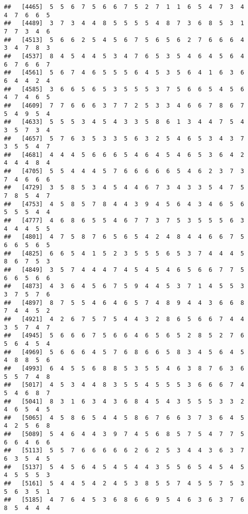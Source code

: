 \documentclass[
]{book}
\begin{document}
\begin{verbatim}
##   [4465]  5  5  6  7  5  6  6  7  5  2  7  1  1  6  5  4  7  3  4  4  7  6  6  5
##   [4489]  3  7  3  4  4  8  5  5  5  5  4  8  7  3  6  8  5  3  1  7  7  3  4  6
##   [4513]  5  6  6  2  5  4  5  6  7  5  6  5  6  2  7  6  6  6  4  3  4  7  8  3
##   [4537]  8  4  5  4  4  5  3  4  7  6  5  3  5  4  6  4  5  6  4  6  7  6  6  7
##   [4561]  5  6  7  4  6  5  5  5  6  4  5  3  5  6  4  1  6  3  6  6  4  4  2  4
##   [4585]  3  6  6  5  6  5  3  5  5  5  3  7  5  6  6  5  4  5  6  4  7  4  6  5
##   [4609]  7  7  6  6  6  3  7  7  2  5  3  3  4  6  6  7  8  6  7  5  4  9  5  4
##   [4633]  5  5  5  3  4  5  4  3  3  5  8  6  1  3  4  4  7  5  4  3  5  7  3  4
##   [4657]  5  7  6  3  5  3  3  5  6  3  2  5  4  6  5  3  4  3  7  3  5  5  4  7
##   [4681]  4  4  4  5  6  6  6  5  4  6  4  5  4  6  5  3  6  4  2  4  4  4  8  4
##   [4705]  5  5  4  4  4  5  7  6  6  6  6  6  5  4  6  2  3  7  3  7  4  6  6  6
##   [4729]  3  5  8  5  3  4  5  4  4  6  7  3  4  3  3  5  4  7  5  7  8  5  4  7
##   [4753]  4  5  8  5  7  8  4  4  3  9  4  5  6  4  3  4  6  5  6  5  5  5  4  4
##   [4777]  4  6  8  6  5  5  4  6  7  7  3  7  5  3  5  5  5  6  3  4  4  4  5  5
##   [4801]  4  7  5  8  7  6  5  6  5  4  2  4  8  4  4  6  6  7  5  6  6  5  6  5
##   [4825]  6  6  5  4  1  5  2  3  5  5  5  6  5  3  7  4  4  4  5  8  6  7  5  3
##   [4849]  3  5  7  4  4  4  7  4  5  4  5  4  6  5  6  6  7  7  5  6  6  5  6  6
##   [4873]  4  3  6  4  5  6  7  5  9  4  4  5  3  7  1  4  5  5  3  3  7  5  7  6
##   [4897]  8  7  5  5  4  6  4  6  5  7  4  8  9  4  4  3  6  6  8  7  4  4  5  2
##   [4921]  4  2  6  7  5  7  5  4  4  3  2  8  6  5  6  6  7  4  4  3  5  7  4  7
##   [4945]  5  6  6  6  7  5  6  6  4  6  5  6  5  2  8  5  2  7  6  5  6  4  5  4
##   [4969]  5  6  6  6  4  5  7  6  8  6  6  5  8  3  4  5  6  4  5  4  8  8  5  6
##   [4993]  6  4  5  5  6  8  8  5  3  5  5  4  6  3  8  7  6  3  6  5  5  7  4  8
##   [5017]  4  5  3  4  4  8  3  5  5  4  5  5  5  3  6  6  6  7  4  5  4  6  8  7
##   [5041]  8  3  1  6  3  4  3  6  8  4  5  4  3  5  5  5  3  3  2  4  6  5  4  5
##   [5065]  4  5  8  6  5  4  4  5  8  6  7  6  6  3  7  3  6  4  5  4  2  5  6  8
##   [5089]  5  4  6  4  4  3  9  7  4  5  6  8  5  7  5  4  7  7  5  6  6  4  6  6
##   [5113]  5  5  7  6  6  6  6  6  2  6  2  5  3  4  4  3  6  3  7  6  3  5  4  5
##   [5137]  5  4  5  6  4  5  4  5  4  4  3  5  5  6  5  4  5  4  5  4  5  5  5  3
##   [5161]  5  4  4  5  4  2  4  5  3  8  5  5  7  4  5  5  7  5  3  5  6  3  5  1
##   [5185]  4  7  6  4  5  3  6  8  6  6  9  5  4  6  3  6  3  7  6  8  5  4  4  4

\end{verbatim}
\end{document}
